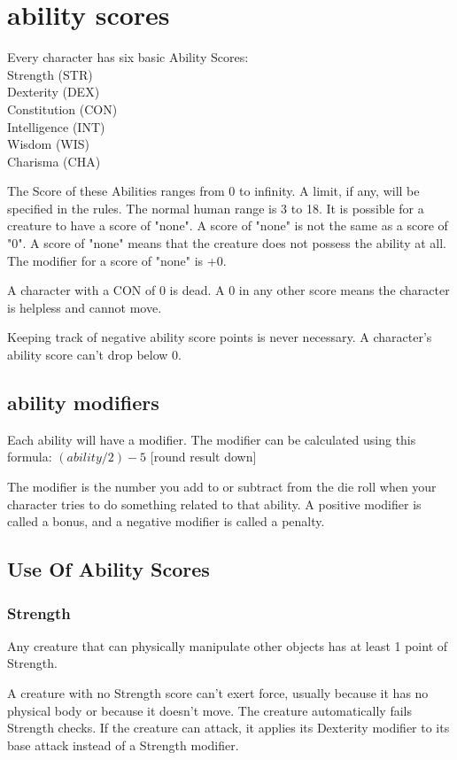 \chapter{ability scores}
Every character has six basic Ability Scores:\\
Strength (STR)\\
Dexterity (DEX)\\
Constitution (CON)\\
Intelligence (INT)\\
Wisdom (WIS)\\
Charisma (CHA) 

The Score of these Abilities ranges from 0 to infinity.  A limit, if
any, will be specified in the rules.  The normal human range is 3 to
18. It is possible for a creature to have a score of "none".  A score of
"none" is not the same as a score of "0".  A score of "none" means that
the creature does not possess the ability at all.  The modifier for a
score of "none" is +0.

A character with a CON of 0 is dead.  A 0 in any other score means the
character is helpless and cannot move.

Keeping track of negative ability score points is never necessary. A
character's ability score can't drop below 0.

\section{ability modifiers}

Each ability will have a modifier. The
modifier can be calculated using this formula:
$(ability/2) -5$ [round result down]

The modifier is the number you add to or subtract from the die roll when
your character tries to do something related to that ability. A positive
modifier is called a bonus, and a negative modifier is called a penalty.

\section{Use Of Ability Scores}
\subsection{Strength}

Any creature that
can physically manipulate other objects has at least 1 point of Strength.

A creature with no Strength score can't exert force, usually because
it has no physical body or because it doesn't move. The creature
automatically fails Strength checks. If the creature can attack,
it applies its Dexterity modifier to its base attack instead of a
Strength modifier. 

